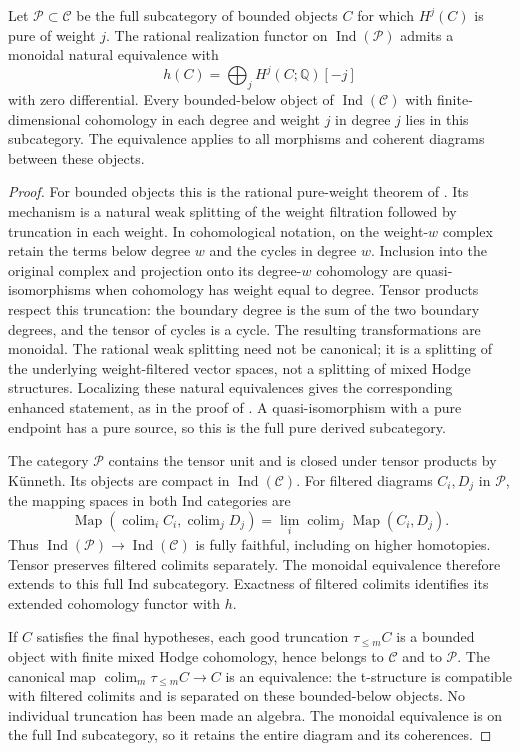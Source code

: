 \begin{lemma}
\label{gh:ind-formality}
Let $\mathcal P\subset\mathcal C$ be the full subcategory of bounded
objects $C$ for which $H^j(C)$ is pure of weight $j$.
The rational realization functor on $\operatorname{Ind}(\mathcal P)$
admits a monoidal natural equivalence with
\[
 h(C)=\bigoplus_j H^j(C;\mathbb Q)[-j]
\]
with zero differential. Every bounded-below object of
$\operatorname{Ind}(\mathcal C)$ with finite-dimensional cohomology
in each degree and weight $j$ in degree $j$ lies in this subcategory.
The equivalence applies to all morphisms and coherent diagrams
between these objects.
\end{lemma}
\begin{proof}
For bounded objects this is the rational pure-weight theorem of
\cite[Proposition 2.7, Lemma 4.4 and Corollary 4.6]{CiriciHorel2022}.
Its mechanism is a natural weak splitting of the weight filtration
followed by truncation in each weight. In cohomological notation, on
the weight-$w$ complex retain the terms below degree $w$ and the
cycles in degree $w$. Inclusion into the original complex and
projection onto its degree-$w$ cohomology are quasi-isomorphisms
when cohomology has weight equal to degree. Tensor products respect
this truncation: the boundary degree is the sum of the two boundary
degrees, and the tensor of cycles is a cycle. The resulting
transformations are monoidal. The rational weak splitting need not
be canonical; it is a splitting of the underlying weight-filtered
vector spaces, not a splitting of mixed Hodge structures.
Localizing these natural equivalences gives the corresponding
enhanced statement, as in the proof of
\cite[Theorem 7.1]{CiriciHorel2022}.
A quasi-isomorphism with a pure endpoint has a pure source, so this
is the full pure derived subcategory.

The category $\mathcal P$ contains the tensor unit and is closed
under tensor products by K\"unneth. Its objects are compact in
$\operatorname{Ind}(\mathcal C)$. For filtered diagrams
$C_i,D_j$ in $\mathcal P$, the mapping spaces in both Ind categories
are
\[
 \operatorname{Map}\left(\mathop{\operatorname{colim}}_i C_i,
                         \mathop{\operatorname{colim}}_j D_j\right)
 =\lim_i\mathop{\operatorname{colim}}_j\operatorname{Map}(C_i,D_j).
\]
Thus $\operatorname{Ind}(\mathcal P)\to
\operatorname{Ind}(\mathcal C)$ is fully faithful, including on
higher homotopies. Tensor preserves filtered colimits separately.
The monoidal equivalence therefore extends to this full Ind
subcategory. Exactness of filtered colimits identifies its extended
cohomology functor with $h$.

If $C$ satisfies the final hypotheses, each good truncation
$\tau_{\leq m}C$ is a bounded object with finite mixed Hodge
cohomology, hence belongs to $\mathcal C$ and to $\mathcal P$.
The canonical map
$\operatorname{colim}_m\tau_{\leq m}C\to C$ is an equivalence:
the t-structure is compatible with filtered colimits and is
separated on these bounded-below objects. No individual truncation
has been made an algebra. The monoidal equivalence is on the full
Ind subcategory, so it retains the entire diagram and its coherences.
\end{proof}

